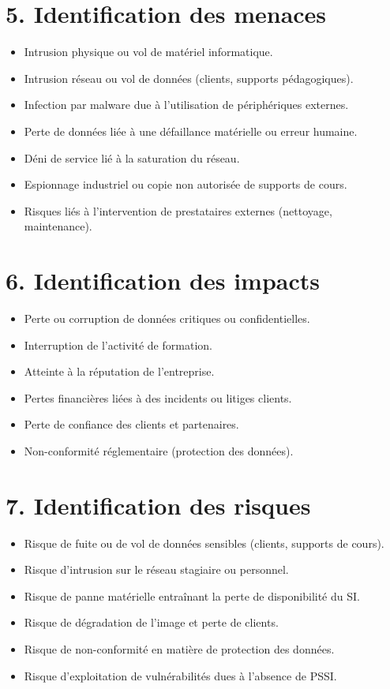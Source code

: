 \documentclass[a4paper,12pt]{article}
\begin{document}
\section*{5. Identification des menaces}
\begin{itemize}
    \item Intrusion physique ou vol de matériel informatique.
    \item Intrusion réseau ou vol de données (clients, supports pédagogiques).
    \item Infection par malware due à l’utilisation de périphériques externes.
    \item Perte de données liée à une défaillance matérielle ou erreur humaine.
    \item Déni de service lié à la saturation du réseau.
    \item Espionnage industriel ou copie non autorisée de supports de cours.
    \item Risques liés à l’intervention de prestataires externes (nettoyage, maintenance).
\end{itemize}

\section*{6. Identification des impacts}
\begin{itemize}
    \item Perte ou corruption de données critiques ou confidentielles.
    \item Interruption de l’activité de formation.
    \item Atteinte à la réputation de l’entreprise.
    \item Pertes financières liées à des incidents ou litiges clients.
    \item Perte de confiance des clients et partenaires.
    \item Non-conformité réglementaire (protection des données).
\end{itemize}

\section*{7. Identification des risques}
\begin{itemize}
    \item Risque de fuite ou de vol de données sensibles (clients, supports de cours).
    \item Risque d’intrusion sur le réseau stagiaire ou personnel.
    \item Risque de panne matérielle entraînant la perte de disponibilité du SI.
    \item Risque de dégradation de l’image et perte de clients.
    \item Risque de non-conformité en matière de protection des données.
    \item Risque d’exploitation de vulnérabilités dues à l’absence de PSSI.
\end{itemize}
\end{document}
